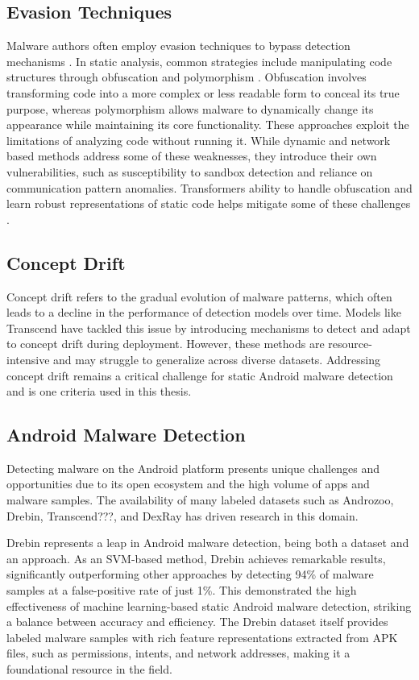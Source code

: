 \subsection{Evasion Techniques}
Malware authors often employ evasion techniques to bypass detection mechanisms \cite{vorlesung}.
In static analysis, common strategies include manipulating code structures through obfuscation \cite{obfuscation} and polymorphism \cite{polymorhism}.
Obfuscation involves transforming code into a more complex or less readable form to conceal its true purpose, whereas polymorphism allows malware to dynamically change its appearance while maintaining its core functionality.
These approaches exploit the limitations of analyzing code without running it.
While dynamic and network based methods address some of these weaknesses, they introduce their own vulnerabilities, such as susceptibility to sandbox detection and reliance on communication pattern anomalies.
Transformers ability to handle obfuscation and learn robust representations of static code helps mitigate some of these challenges \cite{deobfuscation}.

\subsection{Concept Drift}
Concept drift refers to the gradual evolution of malware patterns, which often leads to a decline in the performance of detection models over time.
Models like Transcend \cite{transcend} have tackled this issue by introducing mechanisms to detect and adapt to concept drift during deployment.
However, these methods are resource-intensive and may struggle to generalize across diverse datasets.
Addressing concept drift remains a critical challenge for static Android malware detection and is one criteria used in this thesis.

\subsection{Android Malware Detection}
\label{sec:amd}
Detecting malware on the Android platform presents unique challenges and opportunities due to its open ecosystem and the high volume of apps and malware samples.
The availability of many labeled datasets such as Androzoo, Drebin, Transcend???, and DexRay has driven research in this domain.

Drebin \cite{drebin} represents a leap in Android malware detection, being both a dataset and an approach.
As an SVM-based method, Drebin achieves remarkable results, significantly outperforming other approaches by detecting 94\% of malware samples at a false-positive rate of just 1\%.
This demonstrated the high effectiveness of machine learning-based static Android malware detection, striking a balance between accuracy and efficiency.
The Drebin dataset itself provides labeled malware samples with rich feature representations extracted from APK files, such as permissions, intents, and network addresses, making it a foundational resource in the field.

